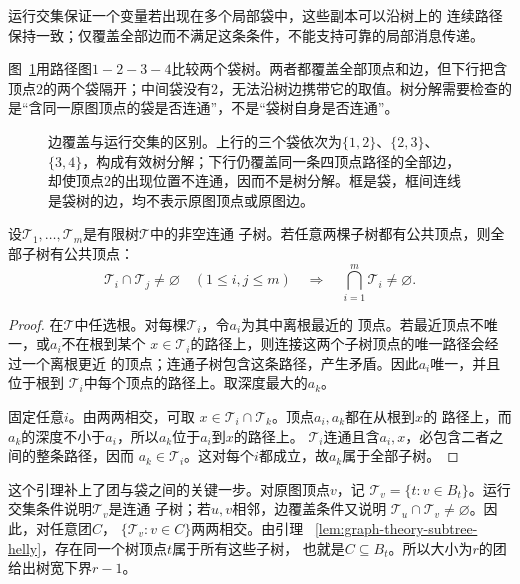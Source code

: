 运行交集保证一个变量若出现在多个局部袋中，这些副本可以沿树上的
连续路径保持一致；仅覆盖全部边而不满足这条条件，不能支持可靠的局部消息传递。

图~\ref{fig:graph-theory-running-intersection}用路径图$1-2-3-4$比较两个袋树。两者都覆盖全部顶点和边，但下行把含顶点$2$的两个袋隔开；中间袋没有$2$，无法沿树边携带它的取值。树分解需要检查的是“含同一原图顶点的袋是否连通”，不是“袋树自身是否连通”。

\begin{figure}[htbp]
 \centering
 
 \caption{边覆盖与运行交集的区别。上行的三个袋依次为$\{1,2\}$、$\{2,3\}$、$\{3,4\}$，构成有效树分解；下行仍覆盖同一条四顶点路径的全部边，却使顶点$2$的出现位置不连通，因而不是树分解。框是袋，框间连线是袋树的边，均不表示原图顶点或原图边。}
 \label{fig:graph-theory-running-intersection}
\end{figure}

\begin{lemma}
  \label{lem:graph-theory-subtree-helly}
  设\(\mathcal{T}_1,\ldots,\mathcal{T}_m\)是有限树\(\mathcal{T}\)中的非空连通
  子树。若任意两棵子树都有公共顶点，则全部子树有公共顶点：
  \[
    \mathcal{T}_i\cap\mathcal{T}_j\neq\varnothing
    \quad(1\leq i,j\leq m)
    \quad\Longrightarrow\quad
    \bigcap_{i=1}^{m}\mathcal{T}_i\neq\varnothing.
  \]
\end{lemma}

\begin{proof}
在\(\mathcal{T}\)中任选根。对每棵\(\mathcal{T}_i\)，令\(a_i\)为其中离根最近的
顶点。若最近顶点不唯一，或\(a_i\)不在根到某个
\(x\in\mathcal{T}_i\)的路径上，则连接这两个子树顶点的唯一路径会经过一个离根更近
的顶点；连通子树包含这条路径，产生矛盾。因此\(a_i\)唯一，并且位于根到
\(\mathcal{T}_i\)中每个顶点的路径上。取深度最大的\(a_k\)。

固定任意\(i\)。由两两相交，可取
\(x\in\mathcal{T}_i\cap\mathcal{T}_k\)。顶点\(a_i,a_k\)都在从根到\(x\)的
路径上，而\(a_k\)的深度不小于\(a_i\)，所以\(a_k\)位于\(a_i\)到\(x\)的路径上。
\(\mathcal{T}_i\)连通且含\(a_i,x\)，必包含二者之间的整条路径，因而
\(a_k\in\mathcal{T}_i\)。这对每个\(i\)都成立，故\(a_k\)属于全部子树。
\end{proof}

这个引理补上了团与袋之间的关键一步。对原图顶点\(v\)，记
\(\mathcal{T}_v=\{t:v\in B_t\}\)。运行交集条件说明\(\mathcal{T}_v\)是连通
子树；若\(u,v\)相邻，边覆盖条件又说明
\(\mathcal{T}_u\cap\mathcal{T}_v\neq\varnothing\)。因此，对任意团\(C\)，
\(\{\mathcal{T}_v:v\in C\}\)两两相交。由引理
~\ref{lem:graph-theory-subtree-helly}，存在同一个树顶点\(t\)属于所有这些子树，
也就是\(C\subseteq B_t\)。所以大小为\(r\)的团给出树宽下界\(r-1\)。

